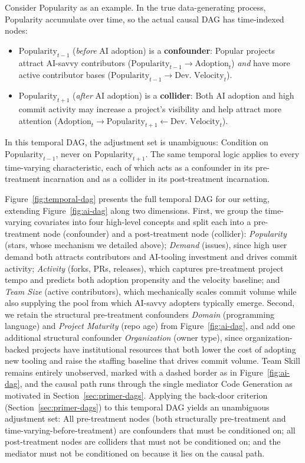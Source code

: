 Consider Popularity as an example.
In the true data-generating process, Popularity accumulate over time, so the actual causal DAG has time-indexed nodes:
\begin{itemize}[leftmargin=15pt]
    \item $\text{Popularity}_{t-1}$ (\emph{before} AI adoption) is a \textbf{confounder}: Popular projects attract AI-savvy contributors ($\text{Popularity}_{t-1} \to \text{Adoption}_t$) \emph{and} have more active contributor bases ($\text{Popularity}_{t-1} \to \text{Dev. Velocity}_t$).
    \item $\text{Popularity}_{t+1}$ (\emph{after} AI adoption) is a \textbf{collider}: Both AI adoption and high commit activity may increase a project's visibility and help attract more attention ($\text{Adoption}_t \to \text{Popularity}_{t+1} \leftarrow \text{Dev. Velocity}_t$).
\end{itemize}
In this temporal DAG, the adjustment set is unambiguous: Condition on $\text{Popularity}_{t-1}$, never on $\text{Popularity}_{t+1}$.
The same temporal logic applies to every time-varying characteristic, each of which acts as a confounder in its pre-treatment incarnation and as a collider in its post-treatment incarnation.

Figure~\ref{fig:temporal-dag} presents the full temporal DAG for our setting, extending Figure~\ref{fig:ai-dag} along two dimensions.
First, we group the time-varying covariates into four high-level concepts and split each into a pre-treatment node (confounder) and a post-treatment node (collider): \emph{Popularity} (stars, whose mechanism we detailed above); \emph{Demand} (issues), since high user demand both attracts contributors and AI-tooling investment and drives commit activity; \emph{Activity} (forks, PRs, releases), which captures pre-treatment project tempo and predicts both adoption propensity and the velocity baseline; and \emph{Team Size} (active contributors), which mechanically scales commit volume while also supplying the pool from which AI-savvy adopters typically emerge.
Second, we retain the structural pre-treatment confounders \emph{Domain} (programming language) and \emph{Project Maturity} (repo age) from Figure~\ref{fig:ai-dag}, and add one additional structural confounder \emph{Organization} (owner type), since organization-backed projects have institutional resources that both lower the cost of adopting new tooling and raise the staffing baseline that drives commit volume.
Team Skill remains entirely unobserved, marked with a dashed border as in Figure~\ref{fig:ai-dag}, and the causal path runs through the single mediator Code Generation as motivated in Section~\ref{sec:primer-dags}.
Applying the back-door criterion (Section~\ref{sec:primer-dags}) to this temporal DAG yields an unambiguous adjustment set: All pre-treatment nodes (both structurally pre-treatment and time-varying-before-treatment) are confounders that must be conditioned on; all post-treatment nodes are colliders that must not be conditioned on; and the mediator must not be conditioned on because it lies on the causal path.

